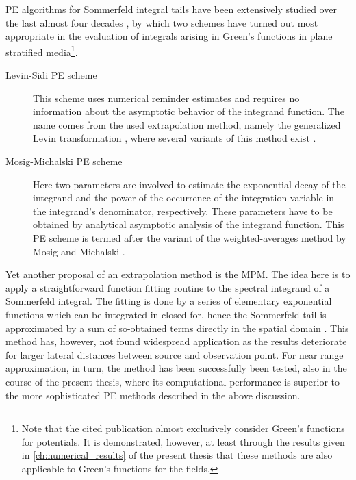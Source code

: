 \Ac{PE} algorithms for Sommerfeld integral tails have been extensively studied
over the last almost four decades
\cite{Michalski1998,Mosig2012,mosig2013,Michalski2016a,Golubovic2012},
by which two schemes have turned out most appropriate in the evaluation of
integrals arising in Green's functions in plane stratified media\footnote{Note
that the cited publication almost exclusively consider Green's functions
for potentials. It is demonstrated, however, at least through the results given in
\cref{ch:numerical_results} of the present thesis that these methods are also
applicable to Green's functions for the fields.}.
\begin{description}
	\item[Levin-Sidi \ac{PE} scheme] This scheme uses numerical reminder
	estimates and requires no information about the asymptotic behavior of the 
	integrand function.
	The name comes from the used extrapolation method, namely the generalized 
	Levin transformation \cite{Levin1972}, where several variants of this 
	method exist \cite{Michalski2016a}.
	\item[Mosig-Michalski \ac{PE} scheme] Here two parameters are involved to
	estimate the exponential decay of the integrand and the power of the
	occurrence of the integration variable in the integrand's denominator,
	respectively.
	These parameters have to be obtained by analytical asymptotic analysis of 
	the integrand function.
	This \ac{PE} scheme is termed after the variant of the weighted-averages
	method by Mosig and Michalski \cite{mosig1983,Michalski1998,Michalski2016a}.
\end{description}

Yet another proposal of an extrapolation method is the \ac{MPM}.
The idea here is to apply a straightforward function fitting routine to the
spectral integrand of a Sommerfeld integral.
The fitting is done by a series of elementary exponential functions which can
be integrated in closed for, hence the Sommerfeld tail is approximated by a
sum of so-obtained terms directly in the spatial domain \cite{MengtaoYuan2006a}.
This method has, however, not found widespread application as the results
deteriorate for larger lateral distances between source and observation point.
For near range approximation, in turn, the method has been successfully been
tested, also in the course of the present thesis, where its computational
performance is superior to the more sophisticated \ac{PE} methods described in
the above discussion.




